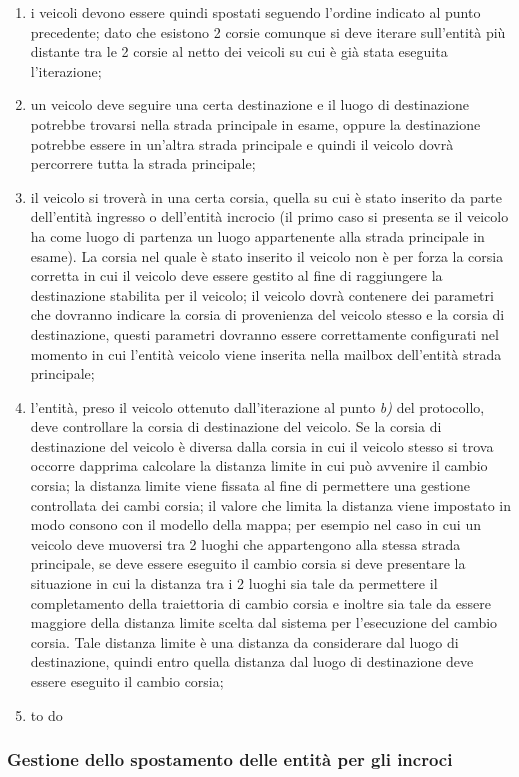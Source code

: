 \begin{enumerate}
\begin{enumerate}
\item i veicoli devono essere quindi spostati seguendo l'ordine indicato al punto precedente; dato che esistono 2 corsie comunque si deve iterare sull'entità più distante tra le 2 corsie al netto dei veicoli su cui è già stata eseguita l'iterazione;
\item un veicolo deve seguire una certa destinazione e il luogo di destinazione potrebbe trovarsi nella strada principale in esame, oppure la destinazione potrebbe essere in un'altra strada principale e quindi il veicolo dovrà percorrere tutta la strada principale;
\item il veicolo si troverà in una certa corsia, quella su cui è stato inserito da parte dell'entità ingresso o dell'entità incrocio (il primo caso si presenta se il veicolo ha come luogo di partenza un luogo appartenente alla strada principale in esame). La corsia nel quale è stato inserito il veicolo non è per forza la corsia corretta in cui il veicolo deve essere gestito al fine di raggiungere la destinazione stabilita per il veicolo; il veicolo dovrà contenere dei parametri che dovranno indicare la corsia di provenienza del veicolo stesso e la corsia di destinazione, questi parametri dovranno essere correttamente configurati nel momento in cui l'entità veicolo viene inserita nella mailbox dell'entità strada principale;
\item l'entità, preso il veicolo ottenuto dall'iterazione al punto \textit{b)} del protocollo, deve controllare la corsia di destinazione del veicolo. Se la corsia di destinazione del veicolo è diversa dalla corsia in cui il veicolo stesso si trova occorre dapprima calcolare la distanza limite in cui può avvenire il cambio corsia; la distanza limite viene fissata al fine di permettere una gestione controllata dei cambi corsia; il valore che limita la distanza viene impostato in modo consono con il modello della mappa; per esempio nel caso in cui un veicolo deve muoversi tra 2 luoghi che appartengono alla stessa strada principale, se deve essere eseguito il cambio corsia si deve presentare la situazione in cui la distanza tra i 2 luoghi sia tale da permettere il completamento della traiettoria di cambio corsia e inoltre sia tale da essere maggiore della distanza limite scelta dal sistema per l'esecuzione del cambio corsia. Tale distanza limite è una distanza da considerare dal luogo di destinazione, quindi entro quella distanza dal luogo di destinazione deve essere eseguito il cambio corsia;
\item to do

\end{enumerate}
\end{enumerate} 

\subsubsection{Gestione dello spostamento delle entità per gli incroci}
\label{spostamentoIncroci}